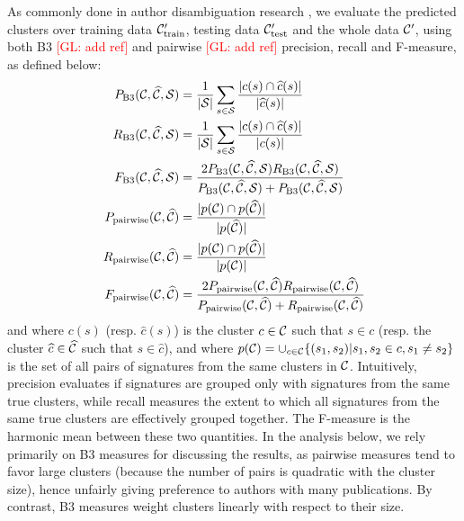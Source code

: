 \documentclass{article}
\newcommand{\glnote}[1]{\textcolor{red}{[GL: #1]}}
\begin{document}
As commonly done in author disambiguation research \citep{levin2012citation},
we evaluate the predicted clusters over training data ${\cal
C}_\text{train}^\prime$, testing data ${\cal C}_\text{test}^\prime$ and the
whole data ${\cal C}^\prime$, using both B3 \glnote{add ref} and pairwise \glnote{add ref} precision, recall
and F-measure, as defined below:
\begin{align}
P_\text{B3}({\cal C}, \widehat{\cal C}, {\cal S}) &= \frac{1}{|{\cal S}|} \sum_{s \in {\cal S}} \frac{|c(s) \cap \widehat{c}(s)|}{|\widehat{c}(s)|} \\
R_\text{B3}({\cal C}, \widehat{\cal C}, {\cal S}) &= \frac{1}{|{\cal S}|} \sum_{s \in {\cal S}} \frac{|c(s) \cap \widehat{c}(s)|}{|c(s)|}\\
F_\text{B3}({\cal C}, \widehat{\cal C}, {\cal S}) &= \frac{2 P_\text{B3}({\cal C}, \widehat{\cal C}, {\cal S}) R_\text{B3}({\cal C}, \widehat{\cal C}, {\cal S})}{P_\text{B3}({\cal C}, \widehat{\cal C}, {\cal S}) + P_\text{B3}({\cal C}, \widehat{\cal C}, {\cal S})}\\
P_\text{pairwise}({\cal C}, \widehat{\cal C}) &= \frac{|p({\cal C}) \cap p(\widehat{\cal C})|}{|p(\widehat{\cal C})|}\\
R_\text{pairwise}({\cal C}, \widehat{\cal C}) &= \frac{|p({\cal C}) \cap p(\widehat{\cal C})|}{|p({\cal C})|}\\
F_\text{pairwise}({\cal C}, \widehat{\cal C}) &= \frac{2 P_\text{pairwise}({\cal C}, \widehat{\cal C}) R_\text{pairwise}({\cal C}, \widehat{\cal C})}{P_\text{pairwise}({\cal C}, \widehat{\cal C}) + R_\text{pairwise}({\cal C}, \widehat{\cal C})}
\end{align}
and where $c(s)$ (resp. $\widehat{c}(s)$) is the cluster $c \in {\cal C}$ such that
$s \in c$ (resp. the cluster $\widehat{c} \in \widehat{\cal C}$ such that $s
\in \widehat{c}$), and where $p({\cal C}) = \cup_{c \in {\cal C}} \{ (s_1, s_2)
| s_1, s_2 \in c, s_1 \neq s_2 \}$ is the set of all pairs of signatures from
the same clusters in ${\cal C}$. Intuitively, precision evaluates if signatures
are grouped only with signatures from the same true clusters, while recall
measures the extent to which all signatures from the same true clusters are
effectively grouped together. The F-measure is the harmonic mean between these
two quantities. In the analysis below, we rely primarily on B3 measures for discussing
the results, as pairwise measures tend to favor large clusters (because the number of pairs is quadratic with the cluster size),
hence unfairly giving preference to authors with many publications. By contrast,
B3 measures weight clusters linearly with respect to their size.
\end{document}
